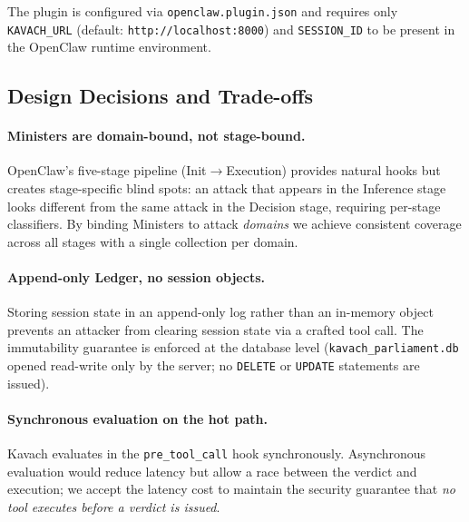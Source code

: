 The plugin is configured via \texttt{openclaw.plugin.json} and requires only
\texttt{KAVACH\_URL} (default: \texttt{http://localhost:8000}) and
\texttt{SESSION\_ID} to be present in the OpenClaw runtime environment.

\subsection{Design Decisions and Trade-offs}

\paragraph{Ministers are domain-bound, not stage-bound.}
OpenClaw's five-stage pipeline (Init$\to$Execution) provides natural hooks but
creates stage-specific blind spots: an attack that appears in the Inference
stage looks different from the same attack in the Decision stage, requiring
per-stage classifiers. By binding Ministers to attack \emph{domains} we achieve
consistent coverage across all stages with a single collection per domain.

\paragraph{Append-only Ledger, no session objects.}
Storing session state in an append-only log rather than an in-memory object
prevents an attacker from clearing session state via a crafted tool call.
The immutability guarantee is enforced at the database level
(\texttt{kavach\_parliament.db} opened read-write only by the server; no
\texttt{DELETE} or \texttt{UPDATE} statements are issued).

\paragraph{Synchronous evaluation on the hot path.}
Kavach evaluates in the \texttt{pre\_tool\_call} hook synchronously.
Asynchronous evaluation would reduce latency but allow a race between the
verdict and execution; we accept the latency cost to maintain the security
guarantee that \emph{no tool executes before a verdict is issued}.
